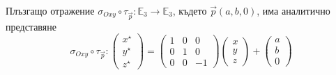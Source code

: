 \documentclass[12pt]{article}
\begin{document}
\begin{tcolorbox}[
    colback=blue!5,    %
    colframe=blue!75!black, %
    title={\textbf{Твърдение 28:}}, %
    fonttitle=\bfseries,
    boxrule=0.8pt,
    arc=1mm,           %
    top=2mm, bottom=2mm, left=3mm, right=3mm
] Плъзгащо отражение $\sigma_{Oxy}\circ\tau_{\vec{p}}:\mathbb{E}_3\to\mathbb{E}_3$, където $\vec{p}(a,b,0)$, има аналитично представяне $$\sigma_{Oxy}\circ\tau_{\vec{p}}:\begin{pmatrix} x^\star \\ y^\star\\ z^\star\end{pmatrix}=\begin{pmatrix} 1 & 0 & 0 \\ 0 & 1 & 0 \\ 0 & 0 & -1\end{pmatrix}\begin{pmatrix} x\\ y\\ z\end{pmatrix}+\begin{pmatrix} a \\ b \\ 0 \end{pmatrix}$$

\end{tcolorbox}
\end{document}
